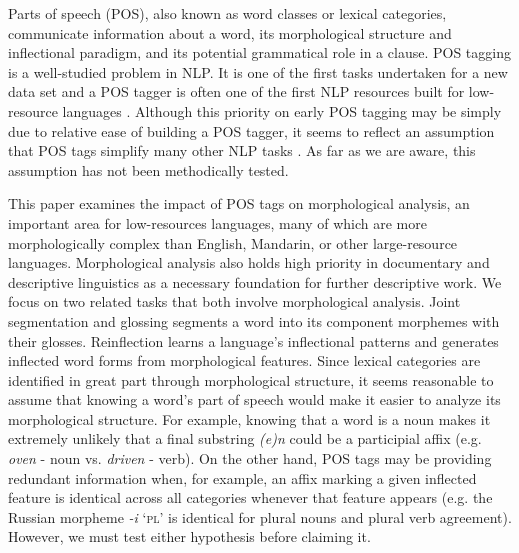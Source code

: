 Parts of speech (POS), also known as word classes or lexical categories, communicate information about a word, its morphological structure and inflectional paradigm, and its potential grammatical role in a clause. 
POS tagging is a well-studied problem in NLP. It is one of the first tasks undertaken for a new data set and a POS tagger is often one of the first NLP resources built for low-resource languages
\citep{yarowsky_inducing_2001,cox_probabilistic_2010,de_pauw_resource-light_2012,baldridge_learning_2013,duong_natural_2017,anastasopoulos_computational_2019,millour_unsupervised_2019,eskander_unsupervised_2020}. Although this priority on early POS tagging may be simply due to relative ease of building a POS tagger, it seems to reflect an assumption that POS tags simplify many other NLP tasks \citep{krauwer_basic_2003}. 
As far as we are aware, this assumption has not been methodically tested. 

This paper examines the impact of POS tags on morphological analysis, an important area for low-resources languages, many of which are more morphologically complex than English, Mandarin, or other large-resource languages. Morphological analysis also holds high priority in documentary and descriptive linguistics as a necessary foundation for further descriptive work. We focus on two related tasks that both involve morphological analysis. Joint segmentation and glossing segments a word into its component morphemes with their glosses. Reinflection learns a language's inflectional patterns and generates inflected word forms from morphological features. Since lexical categories are identified in great part through morphological structure, it seems reasonable to assume that knowing a word's part of speech would make it easier to analyze its morphological structure. For example, knowing that a word is a noun makes it extremely unlikely that a final substring \textit{(e)n} could be a participial affix (e.g. \textit{oven} - noun vs. \textit{driven} - verb). On the other hand, POS tags may be providing redundant information when, for example, an affix marking a given inflected feature is identical across all categories whenever that feature appears (e.g. the Russian morpheme \textit{-i} `\textsc{pl}' is identical for plural nouns and plural verb agreement). However, we must test either hypothesis before claiming it.

